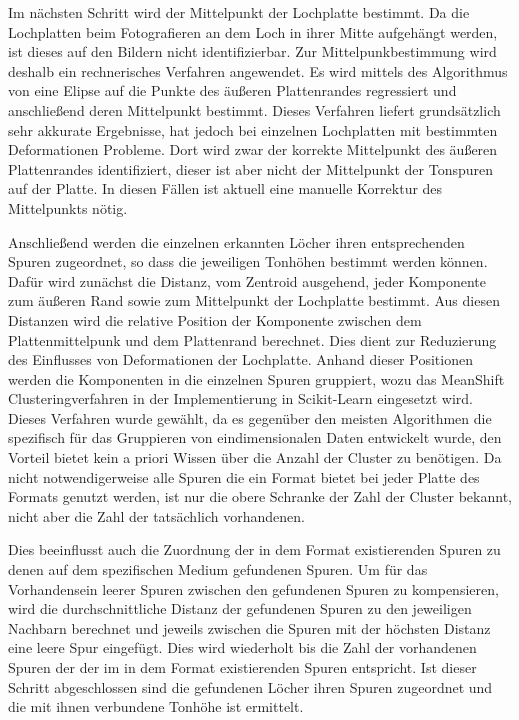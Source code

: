 Im nächsten Schritt wird der Mittelpunkt der Lochplatte bestimmt.
Da die Lochplatten beim Fotografieren an dem Loch in ihrer Mitte aufgehängt werden, ist dieses auf den Bildern nicht identifizierbar.
Zur Mittelpunkbestimmung wird deshalb ein rechnerisches Verfahren angewendet.
Es wird mittels des Algorithmus von \textcite[]{halir1998numerically} eine Elipse auf die Punkte des äußeren Plattenrandes regressiert und anschließend deren Mittelpunkt bestimmt.
Dieses Verfahren liefert grundsätzlich sehr akkurate Ergebnisse, hat jedoch bei einzelnen Lochplatten mit bestimmten Deformationen Probleme.
Dort wird zwar der korrekte Mittelpunkt des äußeren Plattenrandes identifiziert, dieser ist aber nicht der Mittelpunkt der Tonspuren auf der Platte.
In diesen Fällen ist aktuell eine manuelle Korrektur des Mittelpunkts nötig.

Anschließend werden die einzelnen erkannten Löcher ihren entsprechenden Spuren zugeordnet, so dass die jeweiligen Tonhöhen bestimmt werden können.
Dafür wird zunächst die Distanz, vom Zentroid ausgehend, jeder Komponente zum äußeren Rand sowie zum Mittelpunkt der Lochplatte bestimmt.
Aus diesen Distanzen wird die relative Position der Komponente zwischen dem Plattenmittelpunk und dem Plattenrand berechnet.
Dies dient zur Reduzierung des Einflusses von Deformationen der Lochplatte.
Anhand dieser Positionen werden die Komponenten in die einzelnen Spuren gruppiert, wozu das MeanShift Clusteringverfahren \parencite[]{meanshift} in der Implementierung in Scikit-Learn \parencite[]{scikit-learn} eingesetzt wird.
Dieses Verfahren wurde gewählt, da es gegenüber den meisten Algorithmen die spezifisch für das Gruppieren von eindimensionalen Daten entwickelt wurde, den Vorteil bietet kein a priori Wissen über die Anzahl der Cluster zu benötigen.
Da nicht notwendigerweise alle Spuren die ein Format bietet bei jeder Platte des Formats genutzt werden, ist nur die obere Schranke der Zahl der Cluster bekannt, nicht aber die Zahl der tatsächlich vorhandenen.

Dies beeinflusst auch die Zuordnung der in dem Format existierenden Spuren zu denen auf dem spezifischen Medium gefundenen Spuren.
Um für das Vorhandensein leerer Spuren zwischen den gefundenen Spuren zu kompensieren, wird die durchschnittliche Distanz der gefundenen Spuren zu den jeweiligen Nachbarn berechnet und jeweils zwischen die Spuren mit der höchsten Distanz eine leere Spur eingefügt.
Dies wird wiederholt bis die Zahl der vorhandenen Spuren der der im in dem Format existierenden Spuren entspricht.
Ist dieser Schritt abgeschlossen sind die gefundenen Löcher ihren Spuren zugeordnet und die mit ihnen verbundene Tonhöhe ist ermittelt.

